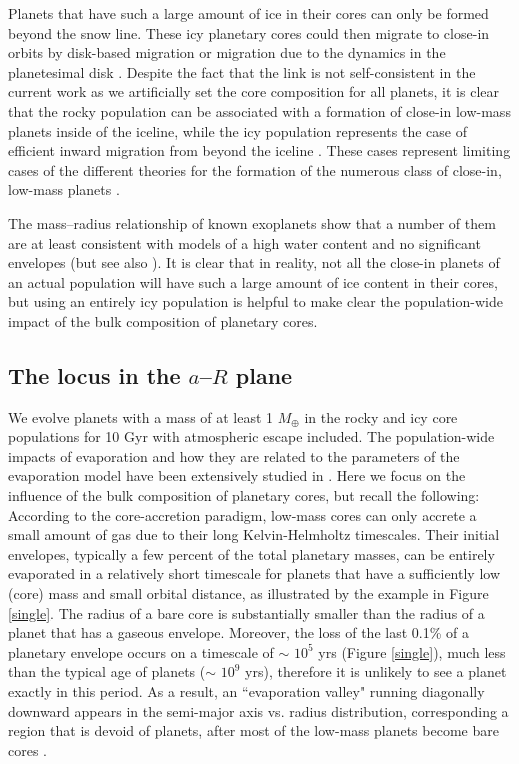 \documentclass[]{emulateapj}
\def\mearth{M_{\oplus}}
\begin{document}
Planets that have such a large amount of ice in their cores can only be formed beyond the snow line. These icy planetary cores could then migrate to close-in orbits by disk-based migration \citep{Goldreich1980,Lin1996,Zhou2005} or migration due to the dynamics in the planetesimal disk \citep{Terquem2007,Ji2011,Ormel2012}. Despite the fact that the link is not self-consistent in the current work as we artificially set the core composition for all planets, it is clear that the rocky population can be associated with a formation of close-in low-mass planets inside of the iceline, while the icy population represents the case of efficient inward migration from beyond the iceline \citep{Baruteau2016}. These cases represent limiting cases of the different theories for the formation of the numerous class of close-in, low-mass planets \citep[e.g., ][]{idalin2010,chianglaughlin2013,raymond2014,Baruteau2016}.

The mass--radius relationship of known exoplanets show that a number of them are at least consistent with models of a high water content and no significant envelopes \citep{Howe2014} (but see also \citealt{Lopez2016}). It is clear that in reality, not all the close-in planets of an actual population will have such a large amount of ice content in their cores, but using an entirely icy population is helpful to make clear the population-wide impact of the bulk composition of planetary cores.

\subsection{{The locus in the $a$--$R$ plane}}
We evolve planets with a mass of at least 1 $\mearth$ in the rocky and icy core populations for 10 Gyr with atmospheric escape included. The population-wide impacts of evaporation and how they are related to the parameters of the evaporation model have been extensively studied in \citet{Jin2014}. Here we focus on the influence of the bulk composition of planetary cores, but recall the following:
According to the core-accretion paradigm, low-mass cores can only accrete a small amount of gas due to their long Kelvin-Helmholtz timescales. Their initial envelopes, typically a few percent of the total planetary masses, can be entirely evaporated in a relatively short timescale for planets that have a sufficiently low (core) mass and small orbital distance, as illustrated by the example in Figure \ref{single}. The radius of a bare core is substantially smaller than the radius of a planet that has a gaseous envelope. Moreover, the loss of the last 0.1\% of a planetary envelope occurs on a timescale of $\sim$ $10^{5}$ yrs (Figure \ref{single}), {much less than the typical age of planets ($\sim$ $10^{9}$ yrs)}, therefore it is unlikely to see a planet exactly in this period. As a result, an ``evaporation valley" running diagonally downward appears in the semi-major axis vs. radius distribution, corresponding a region that is devoid of planets, after most of the low-mass planets become bare cores \citep{Owen2013,Lopez2013,Jin2014,LopezRice2016,ChenRogers2016}.
\end{document}

